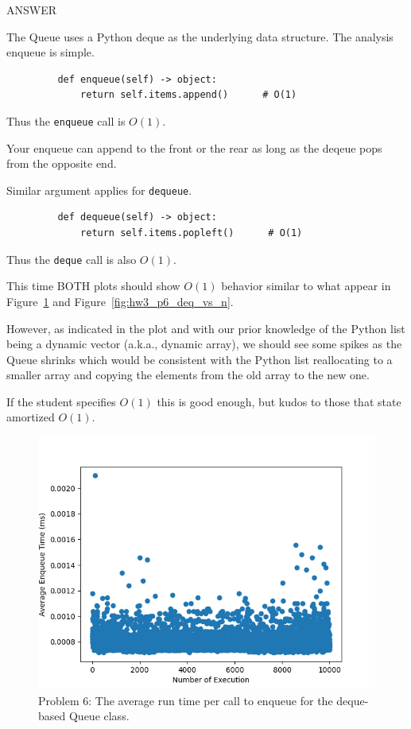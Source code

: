 \documentclass{article} %
\newenvironment{mpage}
  {\hspace{0.1in}
   \begin{minipage}{4.5in}
     \setlength{\parskip}{.5em}
     \vspace{0.1in}}    
  {\vspace{0.1in}
   \end{minipage}}
\begin{document}
\begin{enumerate}
    \begin{mpage}
      ANSWER

      The Queue uses a Python deque as the underlying data structure.
      The analysis enqueue is simple.

\begin{verbatim}
         def enqueue(self) -> object:
             return self.items.append()      # O(1)
\end{verbatim}

      Thus the \verb|enqueue| call is $O(1)$.

      Your enqueue can append to the front or the rear as long
      as the deqeue pops from the opposite end.

      Similar argument applies for \verb|dequeue|.
      
\begin{verbatim}
         def dequeue(self) -> object:
             return self.items.popleft()      # O(1)
\end{verbatim}

      Thus the \verb|deque| call is also $O(1)$.

      This time BOTH plots should show $O(1)$ behavior similar
      to what appear in Figure~\ref{fig:hw3_p6_enq_vs_n} and
      Figure~\ref{fig:hw3_p6_deq_vs_n}.

      However, as indicated in the plot and with our prior knowledge
      of the Python list being a dynamic vector (a.k.a., dynamic
      array), we should see some spikes as the Queue shrinks which
      would be consistent with the Python list reallocating to a
      smaller array and copying the elements from the old array to
      the new one.

      If the student specifies $O(1)$ this is good enough, but kudos
      to those that state amortized $O(1)$.

    \end{mpage}

    \begin{figure}[ht]
      \centering
      \includegraphics[width=\linewidth]{p6/deque_enq_run_time_vs_n.png}
      \caption{Problem 6: The average run time per call to enqueue
        for the deque-based Queue class.}
      \label{fig:hw3_p6_enq_vs_n}
    \end{figure}


\end{enumerate}
\end{document}
